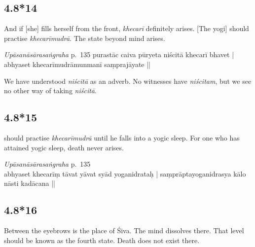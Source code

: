 \begin{ekdosis}
\subsection*{4.8*14}
\begin{translation}[hp04_008_14]
And if [she] fills herself from the front, \emph{khecarī} definitely arises. [The yogi] should practise \emph{khecarīmudrā}. The state beyond mind arises.
\end{translation}


\begin{testimonia}[hp04_008_14]
\emph{Upāsanāsārasaṅgraha} p.~135
purastāc caiva pūryeta niścitā khecarī bhavet |
abhyaset khecarīmudrāmunmanī saṃprajāyate ||
\end{testimonia}

\begin{philcomm}[hp04_008_14]
We have understood \emph{niścitā} as an adverb. No witnesses have \emph{niścitam}, but we see no other way of taking \emph{niścitā}.
\end{philcomm}

\subsection*{4.8*15}
\begin{translation} should practise \emph{khecarīmudrā} until he falls into a yogic sleep. For one who has attained yogic sleep, death never arises.
\end{translation}


\begin{testimonia}[hp04_008_15]
\emph{Upāsanāsārasaṅgraha} p.~135\\
abhyaset khecarīṃ tāvat yāvat syād yoganidrataḥ |
saṃprāptayoganidrasya kālo nāsti kadācana ||
\end{testimonia}

\begin{philcomm}[hp04_008_15]
\end{philcomm}



\subsection*{4.8*16}
\begin{translation}[hp04_008_16]
Between the eyebrows is the place of Śiva. The mind dissolves there. That level should be known as the fourth state. Death does not exist there.
\end{translation}
%


\end{ekdosis}
